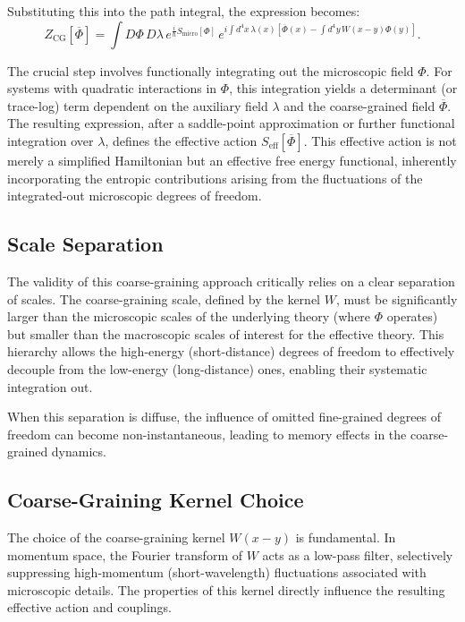 \documentclass[12pt, a4paper]{article}
\begin{document}
Substituting this into the path integral, the expression becomes:
\[
Z_{\mathrm{CG}}[\overline{\Phi}] = \int D\Phi \, D\lambda \, e^{\frac{i}{\hbar} S_{\mathrm{micro}}[\Phi]} \,
e^{i \int d^4 x \, \lambda(x) \left[ \overline{\Phi}(x) - \int d^4 y \, W(x - y) \Phi(y) \right]}.
\]

The crucial step involves functionally integrating out the microscopic field $\Phi$. For systems with quadratic interactions in $\Phi$, this integration yields a determinant (or trace-log) term dependent on the auxiliary field $\lambda$ and the coarse-grained field $\overline{\Phi}$. The resulting expression, after a saddle-point approximation or further functional integration over $\lambda$, defines the effective action $S_{\mathrm{eff}}[\overline{\Phi}]$. This effective action is not merely a simplified Hamiltonian but an effective free energy functional, inherently incorporating the entropic contributions arising from the fluctuations of the integrated-out microscopic degrees of freedom.

\subsection{Scale Separation}

The validity of this coarse-graining approach critically relies on a clear separation of scales. The coarse-graining scale, defined by the kernel $W$, must be significantly larger than the microscopic scales of the underlying theory (where $\Phi$ operates) but smaller than the macroscopic scales of interest for the effective theory. This hierarchy allows the high-energy (short-distance) degrees of freedom to effectively decouple from the low-energy (long-distance) ones, enabling their systematic integration out.

When this separation is diffuse, the influence of omitted fine-grained degrees of freedom can become non-instantaneous, leading to memory effects in the coarse-grained dynamics.

\subsection{Coarse-Graining Kernel Choice}

The choice of the coarse-graining kernel $W(x-y)$ is fundamental. In momentum space, the Fourier transform of $W$ acts as a low-pass filter, selectively suppressing high-momentum (short-wavelength) fluctuations associated with microscopic details. The properties of this kernel directly influence the resulting effective action and couplings.
\end{document}
